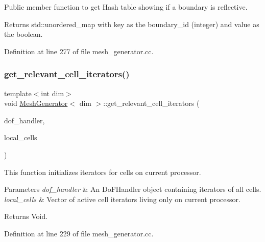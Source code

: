 Public member function to get Hash table showing if a boundary is reflective.

\begin{DoxyReturn}{Returns}
std\+::unordered\+\_\+map with key as the boundary\+\_\+id (integer) and value as the boolean. 
\end{DoxyReturn}


Definition at line 277 of file mesh\+\_\+generator.\+cc.

\mbox{\label{class_mesh_generator_a0c5f845cf8476424892eb7b263672e73}} 
\subsubsection{\texorpdfstring{get\+\_\+relevant\+\_\+cell\+\_\+iterators()}{get\_relevant\_cell\_iterators()}}
{\footnotesize\ttfamily template$<$int dim$>$ \\
void \hyperlink{class_mesh_generator}{Mesh\+Generator}$<$ dim $>$\+::get\+\_\+relevant\+\_\+cell\+\_\+iterators (\begin{DoxyParamCaption}\item[{const Do\+F\+Handler$<$ dim $>$ \&}]{dof\+\_\+handler,  }\item[{std\+::vector$<$ typename Do\+F\+Handler$<$ dim $>$\+::active\+\_\+cell\+\_\+iterator $>$ \&}]{local\+\_\+cells }\end{DoxyParamCaption})}

This function initializes iterators for cells on current processor.


\begin{DoxyParams}{Parameters}
{\em dof\+\_\+handler} & An Do\+F\+Handler object containing iterators of all cells. \\
\hline
{\em local\+\_\+cells} & Vector of active cell iterators living only on current processor. \\
\hline
\end{DoxyParams}
\begin{DoxyReturn}{Returns}
Void. 
\end{DoxyReturn}


Definition at line 229 of file mesh\+\_\+generator.\+cc.

\mbox{\label{class_mesh_generator_aabb238d5d787e8c9834e4a31d2cc5ea9}} 
